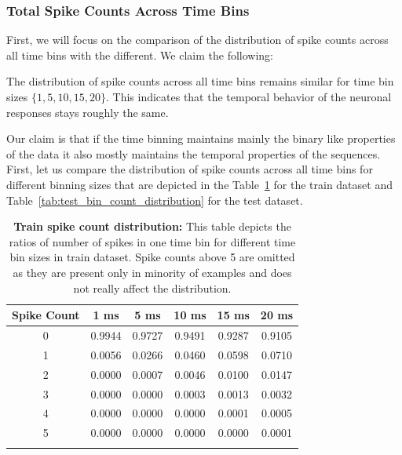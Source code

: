 \subsubsection{Total Spike Counts Across Time Bins}
\label{subsubsec:spike_counts_time_bins}

First, we will focus on the comparison of the distribution of spike counts across all time bins with the different. We claim the following:

\begin{claim}
    The distribution of spike counts across all time bins remains similar for time bin sizes $\{1, 5, 10, 15, 20\}$. This indicates that the temporal behavior of the neuronal responses stays roughly the same.
\end{claim}
\label{claim:tim_bin_counts}

Our claim is that if the time binning maintains mainly the binary like properties of the data it also mostly maintains the temporal properties of the sequences. First, let us compare the distribution of spike counts across all time bins for different binning sizes that are depicted in the Table~\ref{tab:train_bin_count_distribution} for the train dataset and Table~\ref{tab:test_bin_count_distribution} for the test dataset.

\begin{table}
    \centering\footnotesize\sf
    \begin{tabular}{cccccc}
    \toprule
        Spike Count & 1 ms & 5 ms & 10 ms & 15 ms & 20 ms \\
        \midrule
        0 & 0.9944 & 0.9727 & 0.9491 & 0.9287 & 0.9105 \\
        1 & 0.0056 & 0.0266 & 0.0460 & 0.0598 & 0.0710 \\
        2 & 0.0000 & 0.0007 & 0.0046 & 0.0100 & 0.0147 \\
        3 & 0.0000 & 0.0000 & 0.0003 & 0.0013 & 0.0032 \\
        4 & 0.0000 & 0.0000 & 0.0000 & 0.0001 & 0.0005 \\
        5 & 0.0000 & 0.0000 & 0.0000 & 0.0000 & 0.0001 \\
    \addlinespace %
    \bottomrule
    \end{tabular}
    \caption{\textbf{Train spike count distribution:} This table depicts the ratios of number of spikes in one time bin for different time bin sizes in train dataset. Spike counts above 5 are omitted as they are present only in minority of examples and does not really affect the distribution.}
    \label{tab:train_bin_count_distribution}
\end{table}
    

